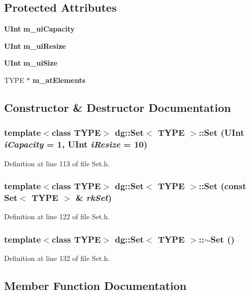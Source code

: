 \subsection*{Protected Attributes}
\begin{CompactItemize}
\item 
{\bf UInt} {\bf m\_\-ui\-Capacity}
\item 
{\bf UInt} {\bf m\_\-ui\-Resize}
\item 
{\bf UInt} {\bf m\_\-ui\-Size}
\item 
TYPE $\ast$ {\bf m\_\-at\-Elements}
\end{CompactItemize}


\subsection{Constructor \& Destructor Documentation}
\subsubsection{\setlength{\rightskip}{0pt plus 5cm}template$<$class TYPE$>$ dg::Set$<$ TYPE $>$::Set ({\bf UInt} {\em i\-Capacity} = 1, {\bf UInt} {\em i\-Resize} = 10)}\label{classdg_1_1Set_a0}




Definition at line 113 of file Set.h.
\subsubsection{\setlength{\rightskip}{0pt plus 5cm}template$<$class TYPE$>$ dg::Set$<$ TYPE $>$::Set (const Set$<$ TYPE $>$ \& {\em rk\-Set})}\label{classdg_1_1Set_a1}




Definition at line 122 of file Set.h.
\subsubsection{\setlength{\rightskip}{0pt plus 5cm}template$<$class TYPE$>$ dg::Set$<$ TYPE $>$::$\sim$Set ()}\label{classdg_1_1Set_a2}




Definition at line 132 of file Set.h.

\subsection{Member Function Documentation}
